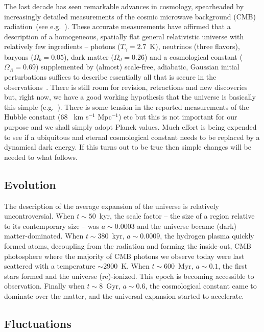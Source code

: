 \documentclass[psfig,11pt]{article}
\begin{document}
The last decade has seen remarkable advances in cosmology, spearheaded by increasingly detailed measurements of the cosmic microwave background (CMB) radiation~(see e.g.\ \cite{Planck2015maps,Planck2015cosmopara}).
These accurate measurements have affirmed that a description of a homogeneous, spatially flat general relativistic universe with relatively few ingredients -- photons ($T_\gamma=2.7$~K), neutrinos (three flavors), baryons ($\Omega_b=0.05$), dark matter ($\Omega_d=0.26$) and a cosmological constant ($\Omega_\Lambda=0.69$) supplemented by (almost) scale-free, adiabatic, Gaussian initial perturbations suffices to describe essentially all that is secure in the observations~\cite{Planck2015cosmopara}. There is still room for revision, retractions and new discoveries but, right now, we have a good working hypothesis that the universe is basically this simple (e.g.~\cite{Weinberg2008, Schneider2015}). There is some tension in the reported measurements of the Hubble constant (68 ~km s$^{-1}$ Mpc$^{-1}$) etc but this is not important for our purpose and we shall simply adopt Planck values. Much effort is being expended to see if a ubiquitous and eternal cosmological constant needs to be replaced by a dynamical dark energy. If this turns out to be true then simple changes will be needed to what follows.

\subsection{Evolution}

The description of the average expansion of the universe is relatively uncontroversial. When  $t\sim 50$~kyr,  the scale factor -- the size of a region relative to its contemporary size -- was $a\sim0.0003$ and the universe became (dark) matter-dominated. When $t\sim380$~kyr, $a\sim0.0009$, the hydrogen plasma quickly formed atoms, decoupling from the radiation and forming the inside-out, CMB photosphere where the majority of CMB photons we observe today were last scattered with a temperature $\sim2900$~K. When $t\sim600$~Myr, $a\sim0.1$, the first stars formed and the universe (re)-ionized. This epoch is becoming accessible to observation. Finally when $t\sim8$~Gyr, $a\sim0.6$, the cosmological constant came to dominate over the matter, and the universal expansion started to accelerate.

\subsection{Fluctuations}
\end{document}
